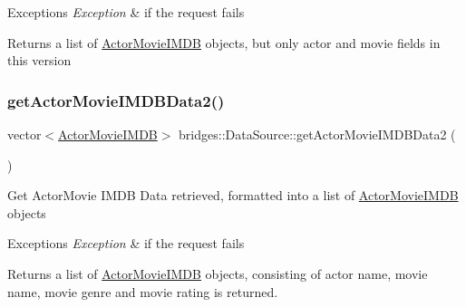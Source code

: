 \begin{DoxyExceptions}{Exceptions}
{\em Exception} & if the request fails\\
\hline
\end{DoxyExceptions}
\begin{DoxyReturn}{Returns}
a list of \mbox{\hyperlink{classbridges_1_1_actor_movie_i_m_d_b}{Actor\+Movie\+I\+M\+DB}} objects, but only actor and movie fields in this version 
\end{DoxyReturn}
\mbox{\label{classbridges_1_1_data_source_a00f0a0a1871d4864c6ccdd04195e0fb2}} 
\subsubsection{\texorpdfstring{get\+Actor\+Movie\+I\+M\+D\+B\+Data2()}{getActorMovieIMDBData2()}}
{\footnotesize\ttfamily vector$<$\mbox{\hyperlink{classbridges_1_1_actor_movie_i_m_d_b}{Actor\+Movie\+I\+M\+DB}}$>$ bridges\+::\+Data\+Source\+::get\+Actor\+Movie\+I\+M\+D\+B\+Data2 (\begin{DoxyParamCaption}{ }\end{DoxyParamCaption})\hspace{0.3cm}{\ttfamily [inline]}}

Get Actor\+Movie I\+M\+DB Data retrieved, formatted into a list of \mbox{\hyperlink{classbridges_1_1_actor_movie_i_m_d_b}{Actor\+Movie\+I\+M\+DB}} objects


\begin{DoxyExceptions}{Exceptions}
{\em Exception} & if the request fails\\
\hline
\end{DoxyExceptions}
\begin{DoxyReturn}{Returns}
a list of \mbox{\hyperlink{classbridges_1_1_actor_movie_i_m_d_b}{Actor\+Movie\+I\+M\+DB}} objects, consisting of actor name, movie name, movie genre and movie rating is returned. 
\end{DoxyReturn}
\mbox{\label{classbridges_1_1_data_source_a52d8161e7c093ab3615acea7085f6689}} 

